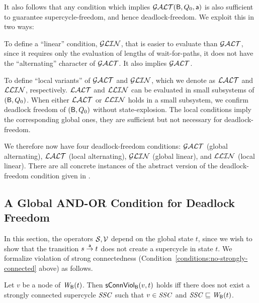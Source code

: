 It also follows that any condition which implies $\GAO(\B, Q_0, \act)$ is also sufficient to guarantee  supercycle-freedom, and
hence deadlock-freedom. We exploit this in two ways:
\bn

\item To define a ``linear'' condition, $\GLin$, that is easier to evaluate than $\GAO$, since it requires only the
evaluation of lengths of wait-for-paths, \ie it does not have the ``alternating'' character of $\GAO$.  It also implies $\GAO$.

\item To define ``local variants'' of $\GAO$ and $\GLin$, which we denote as $\LAO$ and $\LLin$, respectively.  $\LAO$ and $\LLin$ can be evaluated in
  small subsystems of $(\B, Q_0)$. When either $\LAO$ or $\LLin$ holds in a small subsystem, we confirm deadlock freedom of $(\B, Q_0)$ without
  state-explosion. The local conditions imply the corresponding global ones, \ie they are sufficient but not necessary for deadlock-freedom.

\en
%
We therefore now have four deadlock-freedom conditions: $\GAO$ (global alternating), $\LAO$ (local alternating), $\GLin$ (global linear), and $\LLin$
(local linear). There are all concrete instances of the abstract version of the deadlock-freedom condition given in .





   \subsection{A Global AND-OR Condition for Deadlock Freedom}
   \label{s:global.ANDOR}
%   


In this section, the operators $\SFs, \VFs$ depend on the global state $t$, since we wish to show that the transition $s \goesto[\act] t$ does not
create a supercycle in state $t$.
%
We formalize violation of strong connectedness (Condition~\ref{conditions:no-strongly-connected} above)
as follows.

\begin{definition}
\label{def:sConn.violation}
 Let $v$ be a node of $\wfg{\B}{t}$.   Then $\connViol{v}{t}$ holds iff there does not exist a 
strongly connected supercycle $\SSC$ such that $v \in \SSC$ and $\SSC \subg \wfg{\B}{t}$.
\end{definition}



